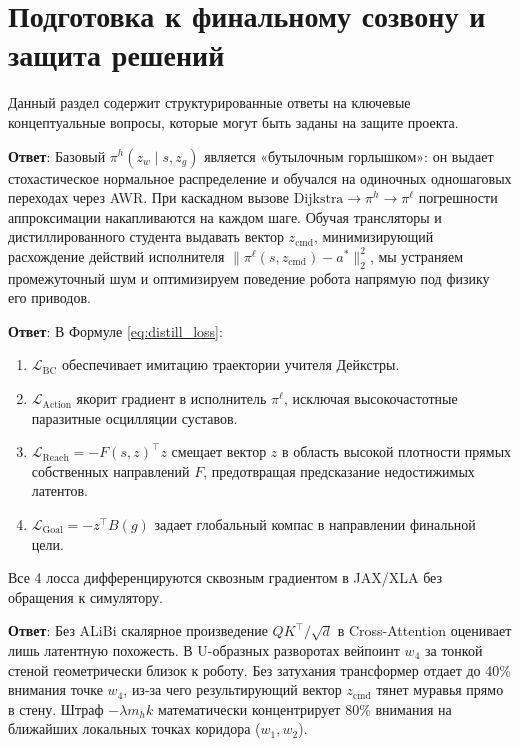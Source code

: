 \FloatBarrier
\section{Подготовка к финальному созвону и защита решений}

Данный раздел содержит структурированные ответы на ключевые концептуальные вопросы, которые могут быть заданы на защите проекта.

\begin{interviewbox}
\textbf{Ответ}: Базовый $\pi^h(z_w \mid s, z_g)$ является «бутылочным горлышком»: он выдает стохастическое нормальное распределение и обучался на одиночных одношаговых переходах через AWR. При каскадном вызове $\text{Dijkstra} \to \pi^h \to \pi^\ell$ погрешности аппроксимации накапливаются на каждом шаге. Обучая трансляторы и дистиллированного студента выдавать вектор $z_{\text{cmd}}$, минимизирующий расхождение действий исполнителя $\|\pi^\ell(s, z_{\text{cmd}}) - a^*\|_2^2$, мы устраняем промежуточный шум и оптимизируем поведение робота напрямую под физику его приводов.
\end{interviewbox}

\begin{interviewbox}
\textbf{Ответ}: В Формуле \ref{eq:distill_loss}:
\begin{enumerate}[leftmargin=*,noitemsep]
    \item $\mathcal{L}_{\text{BC}}$ обеспечивает имитацию траектории учителя Дейкстры.
    \item $\mathcal{L}_{\text{Action}}$ якорит градиент в исполнитель $\pi^\ell$, исключая высокочастотные паразитные осцилляции суставов.
    \item $\mathcal{L}_{\text{Reach}} = -F(s, z)^\top z$ смещает вектор $z$ в область высокой плотности прямых собственных направлений $F$, предотвращая предсказание недостижимых латентов.
    \item $\mathcal{L}_{\text{Goal}} = -z^\top B(g)$ задает глобальный компас в направлении финальной цели.
\end{enumerate}
Все 4 лосса дифференцируются сквозным градиентом в JAX/XLA без обращения к симулятору.
\end{interviewbox}

\begin{interviewbox}
\textbf{Ответ}: Без ALiBi скалярное произведение $Q K^\top / \sqrt{d}$ в Cross-Attention оценивает лишь латентную похожесть. В U-образных разворотах вейпоинт $w_4$ за тонкой стеной геометрически близок к роботу. Без затухания трансформер отдает до 40\% внимания точке $w_4$, из-за чего результирующий вектор $z_{\text{cmd}}$ тянет муравья прямо в стену. Штраф $-\lambda m_h k$ математически концентрирует 80\% внимания на ближайших локальных точках коридора ($w_1, w_2$).
\end{interviewbox}

